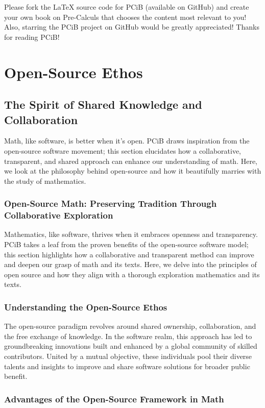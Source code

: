 \documentclass[a4paper,12pt]{book}
\begin{document}
\bigskip
\noindent
Please fork the \LaTeX{} source code for PCiB (available on GitHub) and create your own book on Pre-Calculs that chooses the content most relevant to you! Also, starring the PCiB project on GitHub would be greatly appreciated! Thanks for reading PCiB!

\chapter{Open-Source Ethos}
\section*{The Spirit of Shared Knowledge and Collaboration}
Math, like software, is better when it's open. PCiB draws inspiration from the open-source software movement; this section elucidates how a collaborative, transparent, and shared approach can enhance our understanding of math. Here, we look at the philosophy behind open-source and how it beautifully marries with the study of mathematics.

\subsection*{Open-Source Math: Preserving Tradition Through Collaborative Exploration}
Mathematics, like software, thrives when it embraces openness and transparency. PCiB takes a leaf from the proven benefits of the open-source software model; this section highlights how a collaborative and transparent method can improve and deepen our grasp of math and its texts. Here, we delve into the principles of open source and how they align with a thorough exploration mathematics and its texts.

\subsection*{Understanding the Open-Source Ethos}
The open-source paradigm revolves around shared ownership, collaboration, and the free exchange of knowledge. In the software realm, this approach has led to groundbreaking innovations built and enhanced by a global community of skilled contributors. United by a mutual objective, these individuals pool their diverse talents and insights to improve and share software solutions for broader public benefit.

\subsection*{Advantages of the Open-Source Framework in Math}
\end{document}
